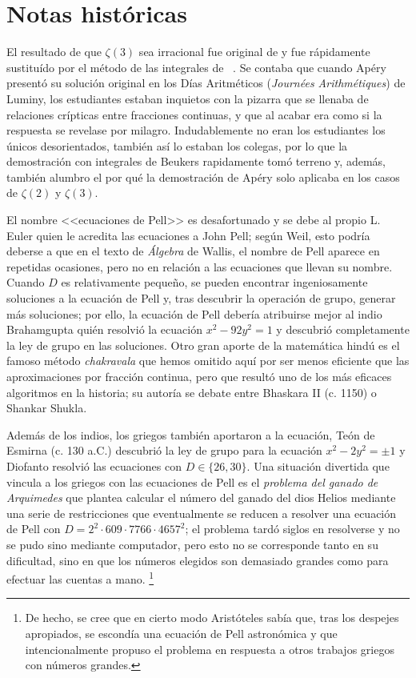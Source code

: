 \documentclass[teoria-numeros.tex]{subfiles}
\begin{document}
\section*{Notas históricas}
El resultado de que $\zeta(3)$ sea irracional fue original de \citet{apery79irrationalite} y
fue rápidamente sustituído por el método de las integrales de \citeauthor{beukers79irrationality}~\cite{beukers79irrationality}.
Se contaba que cuando Apéry presentó su solución original en los Días Aritméticos (\textit{Journées Arithmétiques}) de Luminy, los estudiantes estaban
inquietos con la pizarra que se llenaba de relaciones crípticas entre fracciones continuas, y que al acabar era como si la respuesta se revelase por milagro.
Indudablemente no eran los estudiantes los únicos desorientados, también así lo estaban los colegas, por lo que la demostración con integrales de Beukers
rapidamente tomó terreno y, además, también alumbro el por qué la demostración de Apéry solo aplicaba en los casos de $\zeta(2)$ y $\zeta(3)$.

El nombre <<ecuaciones de Pell>> es desafortunado y se debe al propio L. Euler quien le acredita las ecuaciones a John Pell;
según Weil, esto podría deberse a que en el texto de \textit{Álgebra} de Wallis, el nombre de Pell aparece en repetidas ocasiones, pero no en relación
a las ecuaciones que llevan su nombre.
Cuando $D$ es relativamente pequeño, se pueden encontrar ingeniosamente soluciones a la ecuación de Pell y, tras descubrir la operación de grupo,
generar más soluciones;
por ello, la ecuación de Pell debería atribuirse mejor al indio Brahamgupta quién resolvió la ecuación $x^2 - 92y^2 = 1$ y descubrió completamente la
ley de grupo en las soluciones.
Otro gran aporte de la matemática hindú es el famoso método \textit{chakravala} que hemos omitido aquí por ser menos eficiente que las aproximaciones
por fracción continua, pero que resultó uno de los más eficaces algoritmos en la historia; su autoría se debate entre Bhaskara II (c. 1150)
o Shankar Shukla.

Además de los indios, los griegos también aportaron a la ecuación, Teón de Esmirna (c. 130 a.C.) descubrió la ley de grupo para la ecuación $x^2 - 2y^2 = \pm 1$
y Diofanto resolvió las ecuaciones con $D \in \{ 26, 30 \}$.
Una situación divertida que vincula a los griegos con las ecuaciones de Pell es el \textit{problema del ganado de Arquimedes} que plantea
calcular el número del ganado del dios Helios mediante una serie de restricciones que eventualmente se reducen a resolver una ecuación de Pell
con $D = 2^2 \cdot 609 \cdot 7766 \cdot 4657^2$;
el problema tardó siglos en resolverse y no se pudo sino mediante computador, pero esto no se corresponde tanto en su dificultad, sino en que los
números elegidos son demasiado grandes como para efectuar las cuentas a mano.%
\footnote{De hecho, se cree que en cierto modo Aristóteles sabía que, tras los despejes apropiados, se escondía una ecuación de Pell astronómica y
que intencionalmente propuso el problema en respuesta a otros trabajos griegos con números grandes.}
\end{document}
